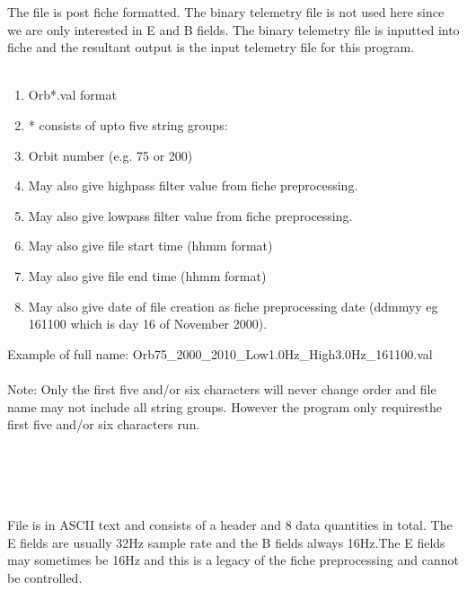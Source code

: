 	The file is post fiche formatted. The binary telemetry file is not used here since we are
	only interested in E and B fields. The binary telemetry file is inputted into fiche and the
	resultant output is the input telemetry file for this program.
\\
\\
\begin{enumerate}
\item Orb*.val format

\item	* consists of upto five string groups:

\item   Orbit number (e.g. 75 or 200)

\item	May also give highpass filter value from fiche preprocessing.

\item	May also give lowpass filter value from fiche preprocessing.

\item  May also give file start time (hhmm format)

\item  May also give file end time (hhmm format)

\item   May also give date of file creation as fiche preprocessing date (ddmmyy eg 161100 which is day 16 of November 2000).

\end{enumerate}


\noindent Example of full name: Orb75\_2000\_2010\_Low1.0Hz\_High3.0Hz\_161100.val\\

\\
\noindent Note: Only the first five and/or six characters will never change order and file name may not include all string groups. However the program only requiresthe first five and/or six characters run.\\

\\

\\
\\

\\
\noindent File is in ASCII text and consists of a header and 8 data quantities in total. The E fields are usually 32Hz sample rate and the B fields always 16Hz.The E fields may sometimes be 16Hz and this is a legacy of the fiche preprocessing and cannot be controlled.\\

